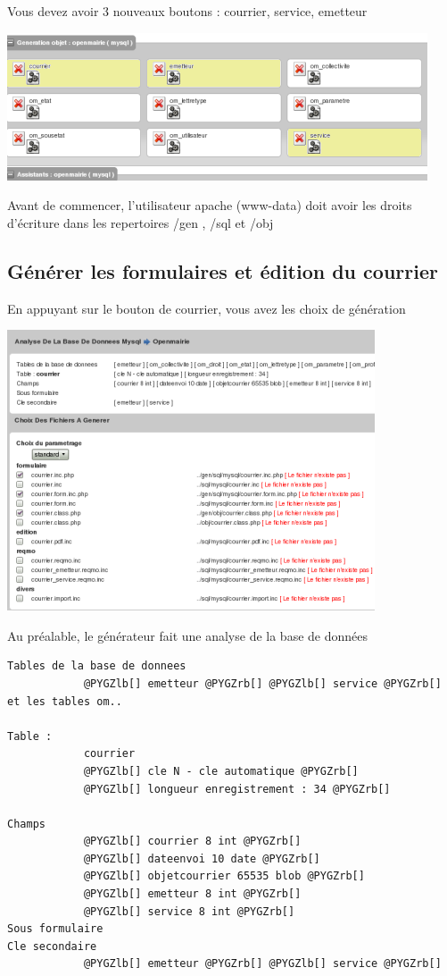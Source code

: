 \documentclass[letterpaper,10pt,french]{manual}
\begin{document}
Vous devez avoir 3 nouveaux boutons : courrier, service, emetteur

\includegraphics{utilisation_1.png}

Avant de commencer, l'utilisateur apache (www-data) doit avoir les droits
d'écriture dans les repertoires /gen , /sql et /obj


\subsection{Générer les formulaires et édition du courrier}

En appuyant sur le bouton de courrier, vous avez les choix de génération

\includegraphics{utilisation_2.png}

Au préalable, le générateur fait une analyse de la base de données

\begin{Verbatim}[commandchars=@\[\]]
Tables de la base de donnees
            @PYGZlb[] emetteur @PYGZrb[] @PYGZlb[] service @PYGZrb[] et les tables om..

Table :
            courrier
            @PYGZlb[] cle N - cle automatique @PYGZrb[]
            @PYGZlb[] longueur enregistrement : 34 @PYGZrb[]

Champs
            @PYGZlb[] courrier 8 int @PYGZrb[]
            @PYGZlb[] dateenvoi 10 date @PYGZrb[]
            @PYGZlb[] objetcourrier 65535 blob @PYGZrb[]
            @PYGZlb[] emetteur 8 int @PYGZrb[]
            @PYGZlb[] service 8 int @PYGZrb[]
Sous formulaire
Cle secondaire
            @PYGZlb[] emetteur @PYGZrb[] @PYGZlb[] service @PYGZrb[]
\end{Verbatim}
\end{document}
